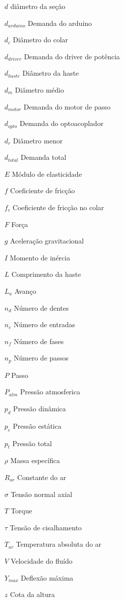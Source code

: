 \begin{simbolos} \itemsep -1pt
	\item[$d$] diâmetro da seção
	\item[$d_{arduino}$] Demanda do arduino
	\item[$d_{c}$] Diâmetro do colar
	\item[$d_{driver}$] Demanda do driver de potência
	\item[$d_{haste}$] Diâmetro da haste 
	\item[$d_{m}$] Diâmetro médio
	\item[$d_{motor}$] Demanda do motor de passo
	\item[$d_{opto}$] Demanda do optoacoplador
	\item[$d_{r}$] Diâmetro menor
	\item[$d_{total}$] Demanda total
	\item[$E$] Módulo de elasticidade
	\item[$f$] Coeficiente de fricção
	\item[$f_{c}$] Coeficiente de fricção no colar
	\item[$F$] Força
	\item[$g$] Aceleração gravitacional
	\item[$I$] Momento de inércia 
	\item[$L$] Comprimento da haste 
	\item[$L_{a}$] Avanço 
	\item[$n_{d}$] Número de dentes
	\item[$n_{e}$] Número de entradas
	\item[$n_{f}$] Número de fases
	\item[$n_{p}$] Número de passos
	\item[$P$] Passo
	\item[$P_{atm}$] Pressão atmosferica
	\item[$p_{d}$] Pressão dinâmica
	\item[$p_{e}$] Pressão estática
	\item[$p_{t}$] Pressão total
	\item[$\rho$] Massa específica
	\item[$R_{ar}$] Constante do ar
	\item[$\sigma$] Tensão normal axial
	\item[$T$] Torque
	\item[$\tau$] Tensão de cisalhamento
	\item[$T_{ar}$] Temperatura absoluta do ar
	\item[$V$] Velocidade do fluído
	\item[$Y_{max}$] Deflexão máxima 
	\item[$z$] Cota da altura
\end{simbolos}